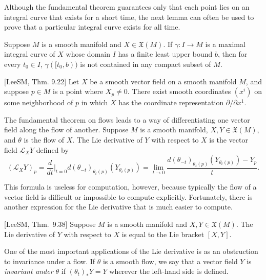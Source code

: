 Although the fundamental theorem guarantees only that each point lies on an
integral curve that exists for a short time, the next lemma can often be used to prove
that a particular integral curve exists for all time.

\begin{lemma}
\label{lem:escape-lemma}
Suppose $M$ is a smooth manifold and $X \in \mathfrak{X}(M)$.
If $\gamma: I \to M$ is a maximal integral curve of $X$ whose domain $I$ has a finite least
upper bound $b$, then for every $t_0 \in I$, $\gamma([t_0, b))$ is not contained in any compact
subset of $M$.
\end{lemma}

\begin{proposition}
\label{prop:canonical-form-vector-field}
[LeeSM, Thm. 9.22] Let $X$ be a smooth vector field on a smooth manifold $M$, and suppose $p \in M$ is a point
where $X_p \ne 0$. There exist smooth coordinates $(x^i)$ on some neighborhood of $p$ in
which $X$ has the coordinate representation $\partial/\partial x^1$.
\end{proposition}

The fundamental theorem on flows leads to a way of differentiating one vector
field along the flow of another. Suppose $M$ is a smooth manifold, $X, Y \in \mathfrak{X}(M)$,
and $\theta$ is the flow of $X$. The Lie derivative of $Y$ with respect to $X$ is the vector field
$\mathcal{L}_X Y$ defined by
\[
(\mathcal{L}_X Y)_p = \frac{d}{dt}\bigg|_{t=0} d(\theta_{-t})_{\theta_t(p)}(Y_{\theta_t(p)}) = \lim_{t \to 0} \frac{d(\theta_{-t})_{\theta_t(p)}(Y_{\theta_t(p)}) - Y_p}{t}.
\]

This formula is useless for computation, however, because typically the flow of a vector field is difficult or impossible to compute explicitly. Fortunately, there is another expression for the Lie derivative that is much easier to compute.

\begin{proposition}
\label{prop:lie-derivative-equals-bracket}
[LeeSM, Thm.~9.38] Suppose $M$ is a smooth manifold and $X, Y \in \mathfrak{X}(M)$. The Lie derivative of $Y$ with respect to $X$ is equal to the Lie bracket $[X,Y]$.
\end{proposition}

One of the most important applications of the Lie derivative is as an obstruction to invariance under a flow. If $\theta$ is a smooth flow, we say that a vector field $Y$ is \emph{invariant under $\theta$} if $(\theta_t)_*Y = Y$ wherever the left-hand side is defined.

